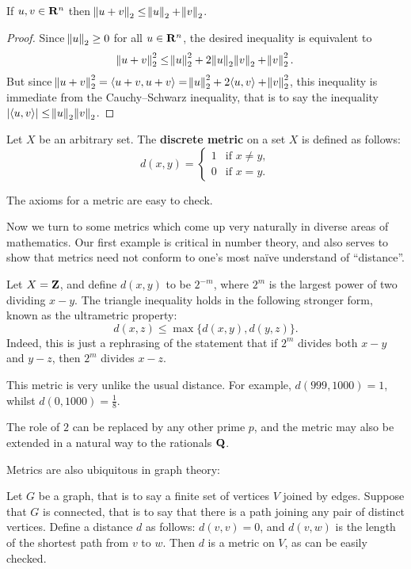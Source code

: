 \begin{lemma}
If $u,v\in\mathbf R^n$ then $\norm{u+v}_2\le\norm{u}_2+\norm{v}_2$.
\end{lemma}

\begin{proof}
Since $\norm{u}_2\ge0$ for all $u\in\mathbf R^n$, the desired inequality is equivalent to
\[\norm{u+v}_2^2\le\norm{u}_2^2+2\norm{u}_2\norm{v}_2+\norm{v}_2^2.\]
But since $\norm{u+v}_2^2=\langle u+v,u+v\rangle=\norm{u}_2^2+2\langle u,v\rangle+\norm{v}_2^2$, this inequality is immediate from the Cauchy--Schwarz inequality, that is to say the inequality $|\langle u,v\rangle|\le\norm{u}_2\norm{v}_2$.
\end{proof}

\begin{example}
Let $X$ be an arbitrary set. The \textbf{discrete metric} on a set $X$ is defined as follows:
\[d(x,y)=\begin{cases}
1&\text{if }x\neq y,\\
0&\text{if }x=y.
\end{cases}\]
\end{example}

The axioms for a metric are easy to check.

Now we turn to some metrics which come up very naturally in diverse areas of mathematics. Our first example is critical in number theory, and also serves to show that metrics need not conform to one's most na\"{i}ve understand of ``distance''.

\begin{example}
Let $X=\mathbf Z$, and define $d(x,y)$ to be $2^{-m}$, where $2^m$ is the largest power of two dividing $x-y$. The triangle inequality holds in the following stronger form, known as the ultrametric property:
\[d(x,z)\le\max\{d(x,y),d(y,z)\}.\]
Indeed, this is just a rephrasing of the statement that if $2^m$ divides both $x-y$ and $y-z$, then $2^m$ divides $x-z$.

This metric is very unlike the usual distance. For example, $d(999,1000) = 1$, whilst $d(0,1000)=\frac{1}{8}$.

The role of $2$ can be replaced by any other prime $p$, and the metric may also be
extended in a natural way to the rationals $\mathbf Q$.
\end{example}

Metrics are also ubiquitous in graph theory:

\begin{example}
Let $G$ be a graph, that is to say a finite set of vertices $V$ joined by edges. Suppose that $G$ is connected, that is to say that there is a path joining any pair of distinct vertices. Define a distance $d$ as follows: $d(v,v)=0$, and $d(v,w)$ is the length of the shortest path from $v$ to $w$. Then $d$ is a metric on $V$, as can be easily checked.
\end{example}

